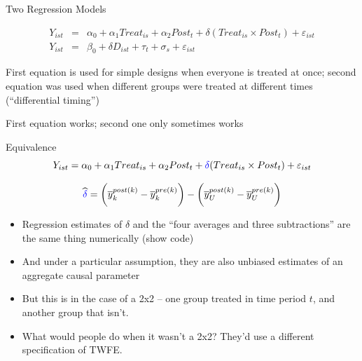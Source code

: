 \documentclass{beamer}
\begin{document}
\begin{frame}{Two Regression Models}

\begin{eqnarray}
Y_{ist} &=& \alpha_0 + \alpha_1 Treat_{is} + \alpha_2 Post_{t} + \delta (Treat_{is} \times Post_t) + \varepsilon_{ist} \\
Y_{ist} &=& \beta_0 + \delta D_{ist} + \tau_t + \sigma_s + \varepsilon_{ist}
\end{eqnarray}

\bigskip

First equation is used for simple designs when everyone is treated at once; second equation was used when different groups were treated at different times (``differential timing'')

\bigskip

First equation works; second one only sometimes works

\end{frame}



\begin{frame}{Equivalence}
$$Y_{ist} = \alpha_0 + \alpha_1 Treat_{is} + \alpha_2 Post_{t} + \textcolor{blue}{\delta} (Treat_{is} \times Post_t) + \varepsilon_{ist} $$

\bigskip

$$\widehat{\textcolor{blue}{\delta}} = \bigg ( \overline{y}_k^{post(k)} - \overline{y}_k^{pre(k)} \bigg ) - \bigg ( \overline{y}_U^{post(k)} - \overline{y}_U^{pre(k)} \bigg ) $$

\begin{itemize}
\item Regression estimates of $\delta$ and the ``four averages and three subtractions'' are the same thing numerically (show code)
\item And under a particular assumption, they are also unbiased estimates of an aggregate causal parameter
\item But this is in the case of a 2x2 -- one group treated in time period $t$, and another group that isn't. 
\item What would people do when it wasn't a 2x2?  They'd use a different specification of TWFE.
\end{itemize}

\end{frame}
\end{document}
